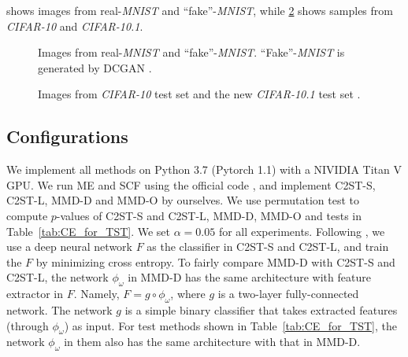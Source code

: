 \documentclass{article}
\begin{document}
 shows images from real-\emph{MNIST} and ``fake''-\emph{MNIST},
while \cref{fig:CIFAR10} shows samples from \emph{CIFAR-10} and \emph{CIFAR-10.1}.

\begin{figure}[ht]
    \begin{center}
        \caption{Images from real-\emph{MNIST} and ``fake''-\emph{MNIST}. ``Fake''-\emph{MNIST} is generated by DCGAN \citep{DCGAN_Radford}.}    \label{fig:MNIST}
    \end{center}
    \vspace{-0.5cm}
\end{figure}

\begin{figure}[!t]
    \begin{center}
        \caption{Images from \emph{CIFAR-10} test set and the new \emph{CIFAR-10.1} test set \citep{recht:imagenet}.}  \label{fig:CIFAR10}
    \end{center}
    \vspace{-0.5cm}
\end{figure}


\subsection{Configurations}\label{Asec:configuration}

We implement all methods on Python 3.7 (Pytorch 1.1) with a NIVIDIA Titan V GPU. We run ME and SCF using the official code \citep{Jitkrittum2016}, and implement C2ST-S, C2ST-L, MMD-D and MMD-O by ourselves. We use permutation test to compute $p$-values of C2ST-S and C2ST-L, MMD-D, MMD-O and tests in Table~\ref{tab:CE_for_TST}. We set $\alpha=0.05$ for all experiments.  Following \citet{Lopez:C2ST}, we use a deep neural network $F$ as the classifier in C2ST-S and C2ST-L, and train the $F$ by minimizing cross entropy.
To fairly compare MMD-D with C2ST-S and C2ST-L, the network $\phi_\omega$ in MMD-D has the same architecture with feature extractor in $F$. Namely, $F = g\circ \phi_\omega$, where $g$ is a two-layer fully-connected network. The network $g$ is a simple binary classifier that takes extracted features (through $\phi_\omega$) as input. For test methods shown in Table~\ref{tab:CE_for_TST}, the network $\phi_\omega$ in them also has the same architecture with that in MMD-D.
\end{document}
